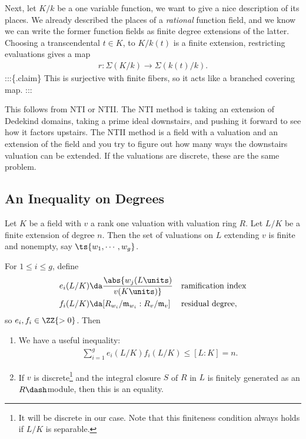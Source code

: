 Next, let \(K/k\) be a one variable function, we want to give a nice
description of its places. We already described the places of a
\emph{rational} function field, and we know we can write the former
function fields as finite degree extensions of the latter. Choosing a
transcendental \(t\in K\), to \(K/k(t)\) is a finite extension,
restricting evaluations gives a map
\begin{align*}  
r: \Sigma(K/k) \to \Sigma(k(t)/ k)
.\end{align*} :::\{.claim\} This is surjective with finite fibers, so it
acts like a branched covering map. :::

This follows from NTI or NTII. The NTI method is taking an extension of
Dedekind domains, taking a prime ideal downstairs, and pushing it
forward to see how it factors upstairs. The NTII method is a field with
a valuation and an extension of the field and you try to figure out how
many ways the downstairs valuation can be extended. If the valuations
are discrete, these are the same problem.

\hypertarget{an-inequality-on-degrees}{%
\subsection{An Inequality on Degrees}\label{an-inequality-on-degrees}}

\begin{theorem}

Let \(K\) be a field with \(v\) a rank one valuation with valuation ring
\(R\). Let \(L/K\) be a finite extension of degree \(n\). Then the set
of valuations on \(L\) extending \(v\) is finite and nonempty, say
\(\ts{w_1, \cdots, w_g}\).

For \(1\leq i \leq g\), define
\begin{align*}  
e_i(L/K) &\da \abs{ w_j (L\units) \over v(K\units) }  && \text{ramification index} \\
f_i(L/K) &\da [R_{w_i}/\mathfrak{m}_{w_i} : R_v/ \mathfrak{m}_v] && \text{residual degree}
,\end{align*} so \(e_i, f_i \in \ZZ{>0}\). Then

\begin{enumerate}
\def\labelenumi{\alph{enumi}.}
\item
  We have a useful inequality:
  \begin{align*}  
  \sum_{i=1}^g e_i(L/K) f_i(L/K) \leq [L: K] = n
  .\end{align*}
\item
  If \(v\) is discrete\footnote{It will be discrete in our case. Note
    that this finiteness condition always holds if \(L/K\) is separable.}
  and the integral closure \(S\) of \(R\) in \(L\) is finitely generated
  as an \(R\dash\)module, then this is an equality.
\end{enumerate}

\end{theorem}

